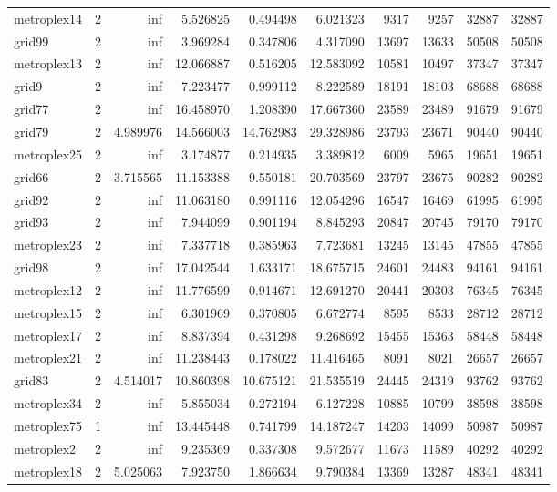 \begin{longtable}{|l|r|r|r|r|r|r|r|r|r|}
metroplex14 & 2 & inf & 5.526825 & 0.494498 & 6.021323 & 9317 & 9257 & 32887 & 32887 \\
grid99 & 2 & inf & 3.969284 & 0.347806 & 4.317090 & 13697 & 13633 & 50508 & 50508 \\
metroplex13 & 2 & inf & 12.066887 & 0.516205 & 12.583092 & 10581 & 10497 & 37347 & 37347 \\
grid9 & 2 & inf & 7.223477 & 0.999112 & 8.222589 & 18191 & 18103 & 68688 & 68688 \\
grid77 & 2 & inf & 16.458970 & 1.208390 & 17.667360 & 23589 & 23489 & 91679 & 91679 \\
grid79 & 2 & 4.989976 & 14.566003 & 14.762983 & 29.328986 & 23793 & 23671 & 90440 & 90440 \\
metroplex25 & 2 & inf & 3.174877 & 0.214935 & 3.389812 & 6009 & 5965 & 19651 & 19651 \\
grid66 & 2 & 3.715565 & 11.153388 & 9.550181 & 20.703569 & 23797 & 23675 & 90282 & 90282 \\
grid92 & 2 & inf & 11.063180 & 0.991116 & 12.054296 & 16547 & 16469 & 61995 & 61995 \\
grid93 & 2 & inf & 7.944099 & 0.901194 & 8.845293 & 20847 & 20745 & 79170 & 79170 \\
metroplex23 & 2 & inf & 7.337718 & 0.385963 & 7.723681 & 13245 & 13145 & 47855 & 47855 \\
grid98 & 2 & inf & 17.042544 & 1.633171 & 18.675715 & 24601 & 24483 & 94161 & 94161 \\
metroplex12 & 2 & inf & 11.776599 & 0.914671 & 12.691270 & 20441 & 20303 & 76345 & 76345 \\
metroplex15 & 2 & inf & 6.301969 & 0.370805 & 6.672774 & 8595 & 8533 & 28712 & 28712 \\
metroplex17 & 2 & inf & 8.837394 & 0.431298 & 9.268692 & 15455 & 15363 & 58448 & 58448 \\
metroplex21 & 2 & inf & 11.238443 & 0.178022 & 11.416465 & 8091 & 8021 & 26657 & 26657 \\
grid83 & 2 & 4.514017 & 10.860398 & 10.675121 & 21.535519 & 24445 & 24319 & 93762 & 93762 \\
metroplex34 & 2 & inf & 5.855034 & 0.272194 & 6.127228 & 10885 & 10799 & 38598 & 38598 \\
metroplex75 & 1 & inf & 13.445448 & 0.741799 & 14.187247 & 14203 & 14099 & 50987 & 50987 \\
metroplex2 & 2 & inf & 9.235369 & 0.337308 & 9.572677 & 11673 & 11589 & 40292 & 40292 \\
metroplex18 & 2 & 5.025063 & 7.923750 & 1.866634 & 9.790384 & 13369 & 13287 & 48341 & 48341 \\

\end{longtable}
